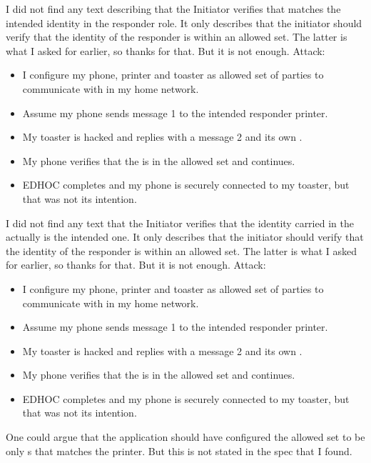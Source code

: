 I did not find any text describing that the Initiator verifies that
 matches the intended identity in the responder role.
%
It only describes that the initiator should verify that the identity of the
responder is within an allowed set.
%
The latter is what I asked for earlier, so thanks for that.
%
But it is not enough.
%
Attack:
%
\begin{itemize}
    \item I configure my phone, printer and toaster as allowed set of parties
        to communicate with in my home network.
    \item Assume my phone sends message 1 to the intended responder printer.
    \item My toaster is hacked and replies with a message 2 and its
        own .
    \item My phone verifies that the  is in the allowed set and
        continues.
    \item EDHOC completes and my phone is securely connected to my toaster,
        but that was not its intention.
\end{itemize}
%
I did not find any text that the Initiator verifies that the identity carried
in the  actually is the intended one.
%
It only describes that the initiator should verify that the identity of the
responder is within an allowed set.
%
The latter is what I asked for earlier, so thanks for that.
%
But it is not enough.
%
Attack:
%
\begin{itemize}
    \item I configure my phone, printer and toaster as allowed set of parties
        to communicate with in my home network.
    \item Assume my phone sends message 1 to the intended responder printer.
    \item My toaster is hacked and replies with a message 2 and its
        own .
    \item My phone verifies that the  is in the allowed set and
        continues.
    \item EDHOC completes and my phone is securely connected to my toaster,
        but that was not its intention.
\end{itemize}
%
One could argue that the application should have configured the allowed set to
be only s that matches the printer.
%
But this is not stated in the spec that I found.
%

